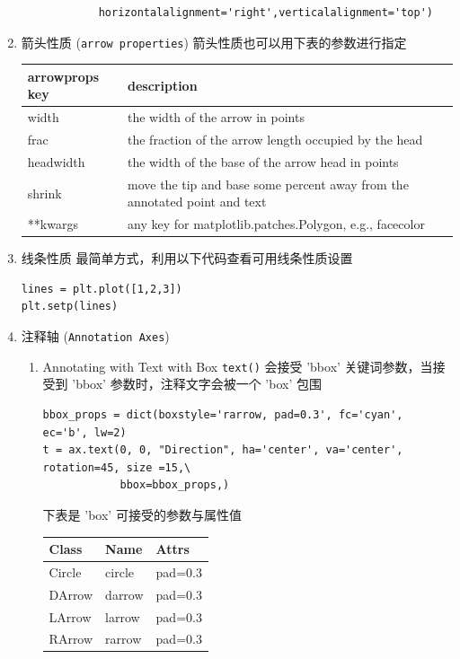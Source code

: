 \documentclass[11pt]{ctexart}
\begin{document}
\begin{enumerate}
\begin{lstlisting}
            horizontalalignment='right',verticalalignment='top')
\end{lstlisting}
\item 箭头性质 (\texttt{arrow properties})
\label{sec:orgheadline22}
箭头性质也可以用下表的参数进行指定
\begin{center}
\begin{tabular}{ll}
arrowprops key & description\\
\hline
width & the width of the arrow in points\\
frac & the fraction of the arrow length occupied by the head\\
headwidth & the width of the base of the arrow head in points\\
shrink & move the tip and base some percent away from the annotated point and text\\
**kwargs & any key for matplotlib.patches.Polygon, e.g., facecolor\\
\end{tabular}
\end{center}
\item 线条性质
\label{sec:orgheadline23}
最简单方式，利用以下代码查看可用线条性质设置
\lstset{language=Python,label= ,caption= ,captionpos=b,numbers=none}
\begin{lstlisting}
lines = plt.plot([1,2,3])
plt.setp(lines)
\end{lstlisting}
\item 注释轴 (\texttt{Annotation Axes})
\label{sec:orgheadline26}
\begin{enumerate}
\item Annotating with Text with Box
\label{sec:orgheadline24}
\texttt{text()} 会接受 'bbox' 关键词参数，当接受到 'bbox' 参数时，注释文字会被一个 'box' 包围
\lstset{language=Python,label= ,caption= ,captionpos=b,numbers=none}
\begin{lstlisting}
bbox_props = dict(boxstyle='rarrow, pad=0.3', fc='cyan', ec='b', lw=2)
t = ax.text(0, 0, "Direction", ha='center', va='center', rotation=45, size =15,\
            bbox=bbox_props,)
\end{lstlisting}
下表是 'box' 可接受的参数与属性值
\begin{center}
\begin{tabular}{lll}
Class & Name & Attrs\\
\hline
Circle & circle & pad=0.3\\
DArrow & darrow & pad=0.3\\
LArrow & larrow & pad=0.3\\
RArrow & rarrow & pad=0.3\\

\end{tabular}
\end{center}
\end{enumerate}
\end{enumerate}
\end{document}
